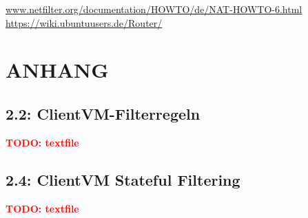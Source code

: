 \documentclass[twoside]{article}
\newcommand{\todo}[1]{\textcolor{red}{\begin{Huge}
	\begin{center}
		\textbf{TODO: #1}
	\end{center}
\end{Huge}}}
\begin{document}
\begin{thebibliography}{1}
			\url{www.netfilter.org/documentation/HOWTO/de/NAT-HOWTO-6.html}
	\url{https://wiki.ubuntuusers.de/Router/}
\end{thebibliography}
\newpage
\section*{ANHANG}
\label{sec:app}
	\subsection*{2.2: ClientVM-Filterregeln}
	\label{2.2-1}
	\todo{textfile}
	\subsection*{2.4: ClientVM Stateful Filtering}
	\label{2.4-1}
	\todo{textfile}
\end{document}
